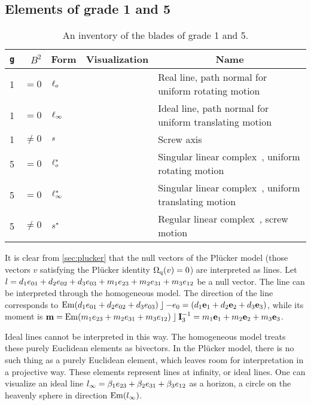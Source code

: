 \subsection{Elements of grade 1 and 5}
\begin{table}
  \caption{An inventory of the blades of grade 1 and 5.  
    }
  \label{tab:inv1}
  \begin{center}
    \begin{tabular}{|c|r|p{2.7cm}|p{2cm}|p{5cm}|}
      \hline
      \multicolumn{1}{|c|}{\texttt{g}} & $B^2$ & \multicolumn{1}{|c|}{Form} & \multicolumn{1}{|c|}{Visualization} & \multicolumn{1}{|c|}{Name} \\ \hline
      \hline
      1 & $= 0$ & $\ell_o$ & & Real line, path normal for uniform rotating motion\\ \hline
      1 & $= 0$ & $\ell_\infty$ & & Ideal line, path normal for uniform translating motion\\ \hline
      1 & $\not= 0$ & $s$ & & Screw axis \\ \hline
      5 & $= 0$ & $\ell_o^\ast$ & & Singular linear complex~\cite{Pottmann}, uniform rotating motion \\ \hline
      5 & $= 0$ & $\ell_\infty^\ast$ & & Singular linear complex~\cite{Pottmann}, uniform translating motion \\ \hline
      5 & $\not= 0$ & $s^\ast$ & & Regular linear complex~\cite{Pottmann}, screw motion \\ \hline
    \end{tabular}
  \end{center}
\end{table}

It is clear from \autoref{sec:plucker} that the null vectors of the Pl\"ucker model (those vectors $v$ satisfying the Pl\"ucker identity $\operatorname{\Omega_q}(v) = 0$) are interpreted as lines.  Let $l = d_1 e_{01} + d_2 e_{02} + d_3 e_{03} + m_1 e_{23} + m_2 e_{31} + m_3 e_{12}$ be a null vector.  The line can be interpreted through the homogeneous model.  The direction of the line corresponds to $\operatorname{Em}(d_1 e_{01} + d_2 e_{02} + d_3 e_{03}) \mathbin{\rfloor} -e_0 = (d_1 \mathbf{e}_1 + d_2 \mathbf{e}_2 + d_3 \mathbf{e}_3)$, while its moment is $\mathbf{m} = \operatorname{Em}(m_1 e_{23} + m_2 e_{31} + m_3 e_{12}) \mathbin{\rfloor} \mathbf{I}_3^{-1} = m_1 \mathbf{e}_1 + m_2 \mathbf{e}_2 + m_3 \mathbf{e}_3$.

Ideal lines cannot be interpreted in this way.  The homogeneous model treats these purely Euclidean elements as bivectors.  In the Pl\"ucker model, there is no such thing as a purely Euclidean element, which leaves room for interpretation in a projective way.  These elements represent lines at infinity, or ideal lines.  One can visualize an ideal line $l_\infty = \beta_1 e_{23} + \beta_2 e_{31} + \beta_3 e_{12}$ as a horizon, a circle on the heavenly sphere in direction $\operatorname{Em}(l_\infty)$.  

